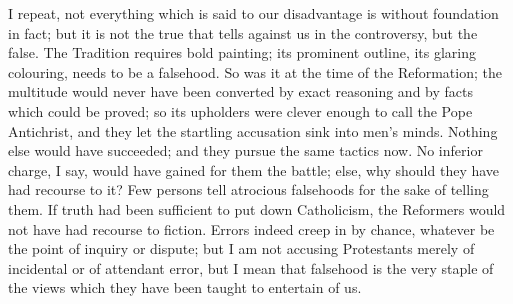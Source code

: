 I repeat, not everything which is said to our
disadvantage is without foundation in fact; but it is not the true that tells against us in the controversy, but
the false. The Tradition requires bold painting; its
prominent outline, its glaring colouring, needs to be a
falsehood. So was it at the time of the Reformation; the
multitude would never have been converted by exact
reasoning and by facts which could be proved; so its
upholders were clever enough to call the Pope Antichrist,
and they let the startling accusation sink into men's
minds. Nothing else would have succeeded; and they pursue
the same tactics now. No inferior charge, I say, would
have gained for them the battle; else, why should they
have had recourse to it? Few persons tell atrocious
falsehoods for the sake of telling them. If truth had
been sufficient to put down Catholicism, the Reformers
would not have had recourse to fiction. Errors indeed
creep in by chance, whatever be the point of inquiry or
dispute; but I am not accusing Protestants merely of
incidental or of attendant error, but I mean that
falsehood is the very staple of the views which they have
been taught to entertain of us.

